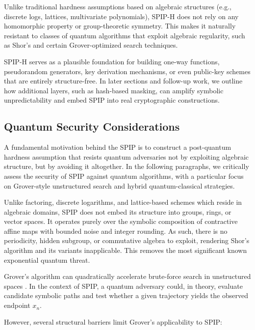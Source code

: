 \documentclass[twocolumn,10pt]{article}
\begin{document}
Unlike traditional hardness assumptions based on algebraic structures (e.g., discrete logs, lattices, multivariate polynomials), SPIP-H does not rely on any homomorphic property or group-theoretic symmetry. This makes it naturally resistant to classes of quantum algorithms that exploit algebraic regularity, such as Shor’s and certain Grover-optimized search techniques.

SPIP-H serves as a plausible foundation for building one-way functions, pseudorandom generators, key derivation mechanisms, or even public-key schemes that are entirely structure-free. In later sections and follow-up work, we outline how additional layers, such as hash-based masking, can amplify symbolic unpredictability and embed SPIP into real cryptographic constructions.


\subsection{Quantum Security Considerations} \label{sec:quantum}
\vspace{0.8em}
A fundamental motivation behind the SPIP is to construct a post-quantum hardness assumption that resists quantum adversaries not by exploiting algebraic structure, but by avoiding it altogether. In the following paragraphs, we critically assess the security of SPIP against quantum algorithms, with a particular focus on Grover-style unstructured search and hybrid quantum-classical strategies.

Unlike factoring, discrete logarithms, and lattice-based schemes which reside in algebraic domains, SPIP does not embed its structure into groups, rings, or vector spaces. It operates purely over the symbolic composition of contractive affine maps with bounded noise and integer rounding. As such, there is no periodicity, hidden subgroup, or commutative algebra to exploit, rendering Shor’s algorithm and its variants inapplicable. This removes the most significant known exponential quantum threat.

Grover's algorithm can quadratically accelerate brute-force search in unstructured spaces \cite{grover1996fast}. In the context of SPIP, a quantum adversary could, in theory, evaluate candidate symbolic paths and test whether a given trajectory yields the observed endpoint $x_n$.

However, several structural barriers limit Grover’s applicability to SPIP:
\end{document}
